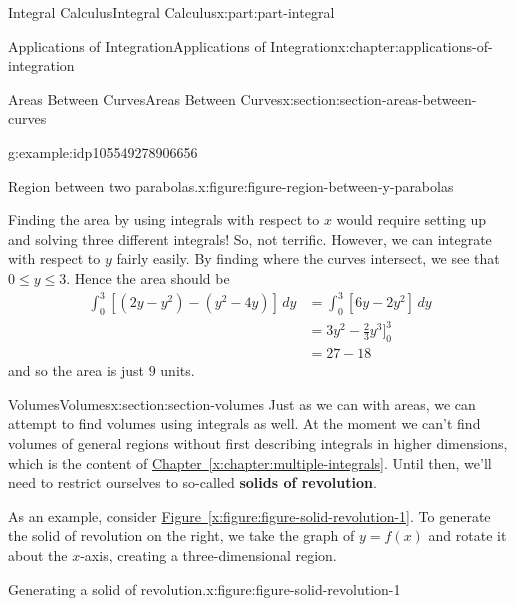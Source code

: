 \documentclass[twoside,10pt,]{book}
\newcommand{\xreffont}{\relax}
\newcommand{\terminology}[1]{\textbf{#1}}
\numberwithin{equation}{part}
\newcommand{\amp}{&}
\begin{document}
\begin{partptx}{Integral Calculus}{}{Integral Calculus}{}{}{x:part:part-integral}
\begin{chapterptx}{Applications of Integration}{}{Applications of Integration}{}{}{x:chapter:applications-of-integration}
\begin{sectionptx}{Areas Between Curves}{}{Areas Between Curves}{}{}{x:section:section-areas-between-curves}
\begin{example}{}{g:example:idp105549278906656}
\begin{figureptx}{Region between two parabolas.}{x:figure:figure-region-between-y-parabolas}{}
\begin{image}{0}{1}{0}
{
}%
\end{image}%
\tcblower
\end{figureptx}%
Finding the area by using integrals with respect to \(x\) would require setting up and solving three different integrals! So, not terrific. However, we can integrate with respect to \(y\) fairly easily. By finding where the curves intersect, we see that \(0\leq y\leq 3\). Hence the area should be%
\begin{align*}
\int_{0}^{3}[(2y - y^{2}) - (y^{2} - 4y)]\,dy \amp = \int_{0}^{3}[6y - 2y^{2}]\,dy \\
\amp = 3y^{2} - \frac{2}{3}y^{3}\Bigg]_{0}^{3} \\
\amp = 27 - 18 
\end{align*}
and so the area is just \(9\) units.%
\end{example}
\end{sectionptx}
%
%
\typeout{************************************************}
\typeout{************************************************}
%
\begin{sectionptx}{Volumes}{}{Volumes}{}{}{x:section:section-volumes}
Just as we can with areas, we can attempt to find volumes using integrals as well. At the moment we can't find volumes of general regions without first describing integrals in higher dimensions, which is the content of \hyperref[x:chapter:multiple-integrals]{Chapter~{\xreffont\ref{x:chapter:multiple-integrals}}}. Until then, we'll need to restrict ourselves to so-called \terminology{solids of revolution}.%
\par
As an example, consider \hyperref[x:figure:figure-solid-revolution-1]{Figure~{\xreffont\ref{x:figure:figure-solid-revolution-1}}}. To generate the solid of revolution on the right, we take the graph of \(y = f(x)\) and rotate it about the \(x\)-axis, creating a three-dimensional region.%
\begin{figureptx}{Generating a solid of revolution.}{x:figure:figure-solid-revolution-1}{}%
\begin{sidebyside}{2}{0}{0}{0}%
\begin{sbspanel}{0.5}%
\resizebox{\linewidth}{!}{%
}
\end{sbspanel}
\end{sidebyside}
\end{figureptx}
\end{sectionptx}
\end{chapterptx}
\end{partptx}
\end{document}
